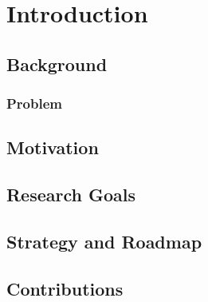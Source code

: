 \chapter{Introduction}

\section{Background}

\subsection{Problem}

\section{Motivation}

\section{Research Goals}

\section{Strategy and Roadmap}

\section{Contributions}